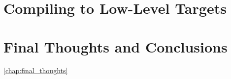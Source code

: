 \chapter{Compiling to Low-Level Targets}




\chapter{Final Thoughts and Conclusions}
\ref{chap:final_thoughts}

%

\listoffigures
\listoftables
{}
\nocite{*}
\printbibliography[heading=bibintoc]

